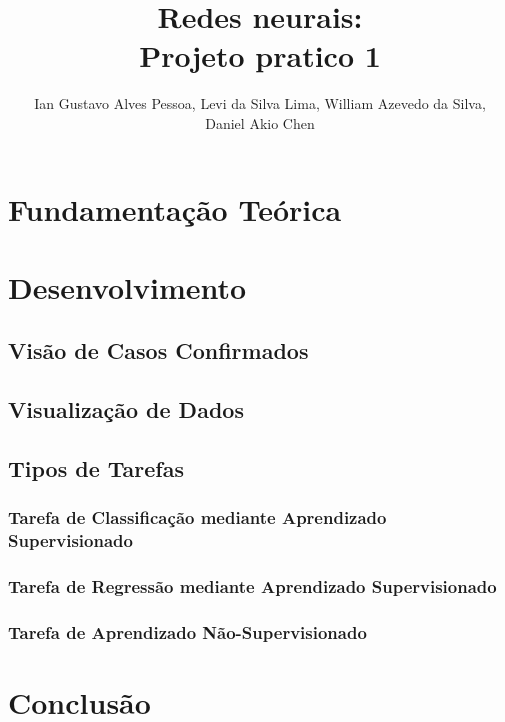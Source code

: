 \documentclass[12pt]{article}
\title{Redes neurais:\\ Projeto pratico 1}
\author{
Ian Gustavo Alves Pessoa\inst{1}, Levi da Silva Lima\inst{2}, William Azevedo da Silva\inst{3}, \\Daniel Akio Chen\inst{4} }
\begin{document}
 

\maketitle



\section{Fundamentação Teórica}



\section{Desenvolvimento}

\subsection{Visão de Casos Confirmados}



\subsection{Visualização de Dados}



\subsection{Tipos de Tarefas}

\subsubsection{Tarefa de Classificação mediante Aprendizado Supervisionado}



\subsubsection{Tarefa de Regressão mediante Aprendizado Supervisionado}



\subsubsection{Tarefa de Aprendizado Não-Supervisionado}






\section{Conclusão}



\nocite{*}


\end{document}
